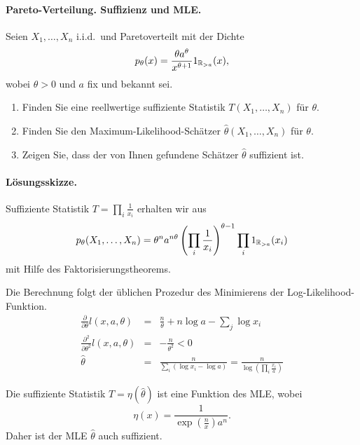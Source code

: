 \paragraph{Pareto-Verteilung. Suffizienz und MLE.} Seien $X_1,\ldots,X_n$ i.i.d.\ und
Paretoverteilt mit der Dichte
\begin{equation*}
    p_\theta(x)= \frac{\theta a^\theta}{x^{\theta+1}}1_{\mathbb R_{>a}}(x),
\end{equation*}
wobei $\theta>0$ und $a$ fix und bekannt sei.
\begin{enumerate}
    \item Finden Sie eine reellwertige suffiziente Statistik $T(X_1,\ldots,X_n)$ für $\theta$.
    \item Finden Sie den Maximum-Likelihood-Schätzer $\hat \theta(X_1,\ldots,X_n)$ für $\theta$.
    \item Zeigen Sie, dass der von Ihnen gefundene Schätzer $\hat \theta$ suffizient ist.
\end{enumerate}

\paragraph*{Lösungsskizze. }
Suffiziente Statistik $T= \prod_i \frac{1}{x_i}$ erhalten wir aus 
\begin{equation}
    p_\theta(X_1,\ldots,X_n) = 
    \theta^n a^{n\theta} \left( \prod_i \frac{1}{x_i} \right)^{\theta-1} \prod_i 1_{\mathbb R_{>a}}(x_i)
\end{equation}
mit Hilfe des Faktorisierungstheorems.

Die Berechnung folgt der üblichen Prozedur des Minimierens der Log-Likelihood-Funktion.
\begin{eqnarray}
    \frac{\partial}{\partial \theta} l(x,a,\theta) &=& 
    \frac{n}{\theta} + n \log a -\sum_{j}^{} \log x_i \\
    \frac{\partial^2}{\partial \theta^2} l(x,a,\theta) &=& - \frac{n}{\theta^2} < 0 \\
    \hat\theta &=& \frac{n}{ \sum_{i}^{} \left( \log x_i - \log a \right)} 
    = \frac{n}{ \log \left( \prod_i \frac{x_i}{a}  \right) }
\end{eqnarray}

Die suffiziente Statistik $T=\eta (\hat\theta)$ ist eine Funktion des MLE, wobei 
\begin{equation}
    \eta(x) = \frac{1}{ \exp\left( \frac{n}{x} \right) a^n}.
\end{equation}
Daher ist der MLE $\hat\theta$ auch suffizient.



